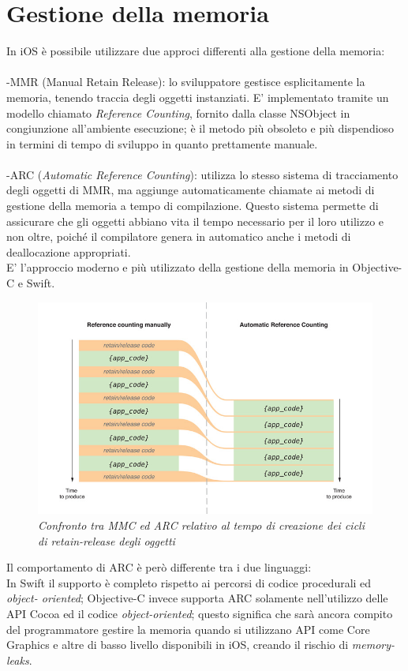 \section{Gestione della memoria}
In iOS è possibile utilizzare due approci differenti alla gestione della memoria:\\
\\-MMR (Manual Retain Release): lo sviluppatore gestisce esplicitamente la memoria, tenendo traccia degli oggetti instanziati. E' implementato tramite un modello chiamato \textit{Reference Counting}, fornito dalla classe NSObject in congiunzione all'ambiente esecuzione; è il metodo più obsoleto e più dispendioso in termini di tempo di sviluppo in quanto prettamente manuale.\\
\\-ARC (\textit{Automatic Reference Counting}): utilizza lo stesso sistema di tracciamento degli oggetti di MMR, ma aggiunge automaticamente chiamate ai metodi di gestione della memoria a tempo di compilazione. Questo sistema permette di assicurare che gli oggetti abbiano vita il tempo necessario per il loro utilizzo e non oltre, poiché il compilatore genera in automatico anche i metodi di deallocazione appropriati.\\E' l'approccio moderno e più utilizzato della gestione della memoria in Objective-C e Swift.
\begin{figure}[H]
      \centering
      \includegraphics[scale=0.50]{immagini/ARC.jpg}
            \vspace{0.8cm}
            \caption{\textit{Confronto tra MMC ed ARC relativo al tempo di creazione dei cicli di retain-release degli oggetti}}
    \end{figure}
Il comportamento di ARC è però differente tra i due linguaggi:\\
In Swift il supporto è completo rispetto ai percorsi di codice procedurali ed \textit{object- oriented}; Objective-C invece supporta ARC solamente nell'utilizzo delle API Cocoa ed il codice \textit{object-oriented}; questo significa che sarà ancora compito del programmatore gestire la memoria quando si utilizzano API come Core Graphics e altre di basso livello disponibili in iOS, creando il rischio di \textit{memory-leaks}.
